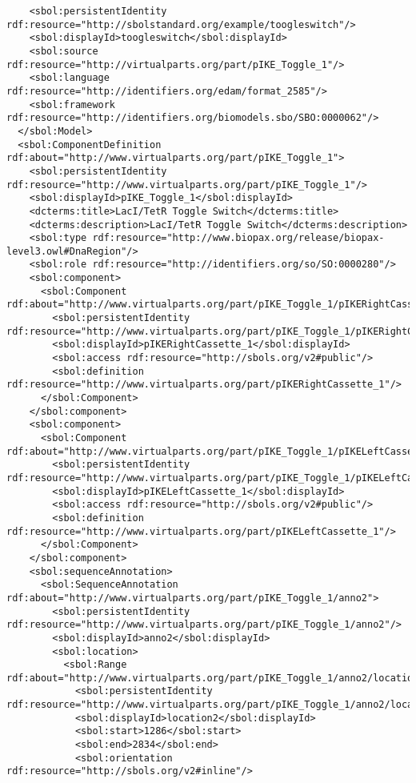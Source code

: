 \begin{lstlisting}
    <sbol:persistentIdentity rdf:resource="http://sbolstandard.org/example/toogleswitch"/>
    <sbol:displayId>toogleswitch</sbol:displayId>
    <sbol:source rdf:resource="http://virtualparts.org/part/pIKE_Toggle_1"/>
    <sbol:language rdf:resource="http://identifiers.org/edam/format_2585"/>
    <sbol:framework rdf:resource="http://identifiers.org/biomodels.sbo/SBO:0000062"/>
  </sbol:Model>
  <sbol:ComponentDefinition rdf:about="http://www.virtualparts.org/part/pIKE_Toggle_1">
    <sbol:persistentIdentity rdf:resource="http://www.virtualparts.org/part/pIKE_Toggle_1"/>
    <sbol:displayId>pIKE_Toggle_1</sbol:displayId>
    <dcterms:title>LacI/TetR Toggle Switch</dcterms:title>
    <dcterms:description>LacI/TetR Toggle Switch</dcterms:description>
    <sbol:type rdf:resource="http://www.biopax.org/release/biopax-level3.owl#DnaRegion"/>
    <sbol:role rdf:resource="http://identifiers.org/so/SO:0000280"/>
    <sbol:component>
      <sbol:Component rdf:about="http://www.virtualparts.org/part/pIKE_Toggle_1/pIKERightCassette_1">
        <sbol:persistentIdentity rdf:resource="http://www.virtualparts.org/part/pIKE_Toggle_1/pIKERightCassette_1"/>
        <sbol:displayId>pIKERightCassette_1</sbol:displayId>
        <sbol:access rdf:resource="http://sbols.org/v2#public"/>
        <sbol:definition rdf:resource="http://www.virtualparts.org/part/pIKERightCassette_1"/>
      </sbol:Component>
    </sbol:component>
    <sbol:component>
      <sbol:Component rdf:about="http://www.virtualparts.org/part/pIKE_Toggle_1/pIKELeftCassette_1">
        <sbol:persistentIdentity rdf:resource="http://www.virtualparts.org/part/pIKE_Toggle_1/pIKELeftCassette_1"/>
        <sbol:displayId>pIKELeftCassette_1</sbol:displayId>
        <sbol:access rdf:resource="http://sbols.org/v2#public"/>
        <sbol:definition rdf:resource="http://www.virtualparts.org/part/pIKELeftCassette_1"/>
      </sbol:Component>
    </sbol:component>
    <sbol:sequenceAnnotation>
      <sbol:SequenceAnnotation rdf:about="http://www.virtualparts.org/part/pIKE_Toggle_1/anno2">
        <sbol:persistentIdentity rdf:resource="http://www.virtualparts.org/part/pIKE_Toggle_1/anno2"/>
        <sbol:displayId>anno2</sbol:displayId>
        <sbol:location>
          <sbol:Range rdf:about="http://www.virtualparts.org/part/pIKE_Toggle_1/anno2/location2">
            <sbol:persistentIdentity rdf:resource="http://www.virtualparts.org/part/pIKE_Toggle_1/anno2/location2"/>
            <sbol:displayId>location2</sbol:displayId>
            <sbol:start>1286</sbol:start>
            <sbol:end>2834</sbol:end>
            <sbol:orientation rdf:resource="http://sbols.org/v2#inline"/>

\end{lstlisting}
